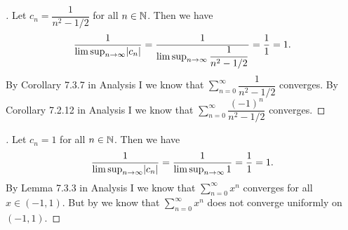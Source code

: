 \begin{proof}[]
  Let \(c_n = \dfrac{1}{n^2 - 1 / 2}\) for all \(n \in \mathbb{N}\).
  Then we have
  \[
    \dfrac{1}{\limsup_{n \to \infty} \abs{c_n}} = \dfrac{1}{\limsup_{n \to \infty} \dfrac{1}{n^2 - 1 / 2}} = \dfrac{1}{1} = 1.
  \]
  By Corollary 7.3.7 in Analysis I we know that \(\sum_{n = 0}^\infty \dfrac{1}{n^2 - 1 / 2}\) converges.
  By Corollary 7.2.12 in Analysis I we know that \(\sum_{n = 0}^\infty \dfrac{(-1)^n}{n^2 - 1 / 2}\) converges.
\end{proof}

\begin{proof}[]
  Let \(c_n = 1\) for all \(n \in \mathbb{N}\).
  Then we have
  \[
    \dfrac{1}{\limsup_{n \to \infty} \abs{c_n}} = \dfrac{1}{\limsup_{n \to \infty} 1} = \dfrac{1}{1} = 1.
  \]
  By Lemma 7.3.3 in Analysis I we know that \(\sum_{n = 0}^\infty x^n\) converges for all \(x \in (-1, 1)\).
  But by  we know that \(\sum_{n = 0}^\infty x^n\) does not converge uniformly on \((-1, 1)\).
\end{proof}
